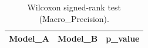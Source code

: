 \begin{table}[t]
\centering
\begin{tabular}{lll}
\toprule
Model_A & Model_B & p_value \\
\midrule
\bottomrule
\end{tabular}
\caption{Wilcoxon signed-rank test (Macro_Precision).}
\label{tab:wilcoxon_Macro_Precision}
\end{table}